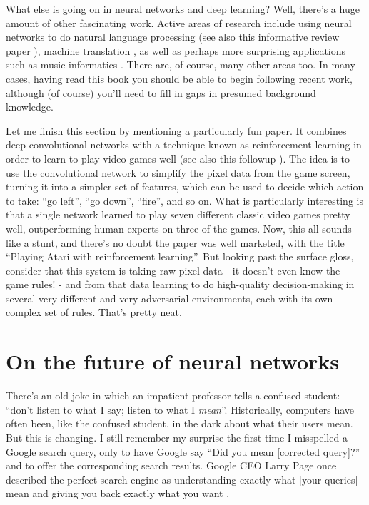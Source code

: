 What else is going on in neural networks and deep learning? Well, there's a huge amount of other fascinating work. Active areas of research include using neural networks to do natural language processing \cite{CollobertNLP2008} (see also this informative review paper \cite{CollobertNLP2011}), machine translation \cite{SutskeveS2SLNN2014}, as well as perhaps more surprising applications such as music informatics \cite{HumphreyMusic2013}. There are, of course, many other areas too. In many cases, having read this book you should be able to begin following recent work, although (of course) you'll need to fill in gaps in presumed background knowledge.

Let me finish this section by mentioning a particularly fun paper. It combines deep convolutional networks with a technique known as reinforcement learning in order to learn to play video games well \cite{MnihKSGAWR13} (see also this followup \cite{mnihnature2015}). The idea is to use the convolutional network to simplify the pixel data from the game screen, turning it into a simpler set of features, which can be used to decide which action to take: ``go left'', ``go down'', ``fire'', and so on. What is particularly interesting is that a single network learned to play seven different classic video games pretty well, outperforming human experts on three of the games. Now, this all sounds like a stunt, and there's no doubt the paper was well marketed, with the title ``Playing Atari with reinforcement learning''. But looking past the surface gloss, consider that this system is taking raw pixel data - it doesn't even know the game rules! - and from that data learning to do high-quality decision-making in several very different and very adversarial environments, each with its own complex set of rules. That's pretty neat.

\section{On the future of neural networks}
\label{sec:Onthefutureofneuralnetworks}

 There's an old joke in which an impatient professor tells a confused student: ``don't listen to what I say; listen to what I \textit{mean}''. Historically, computers have often been, like the confused student, in the dark about what their users mean. But this is changing. I still remember my surprise the first time I misspelled a Google search query, only to have Google say ``Did you mean [corrected query]?'' and to offer the corresponding search results. Google CEO Larry Page once described the perfect search engine as understanding exactly what [your queries] mean and giving you back exactly what you want \cite{GoogleBlog2012}.

